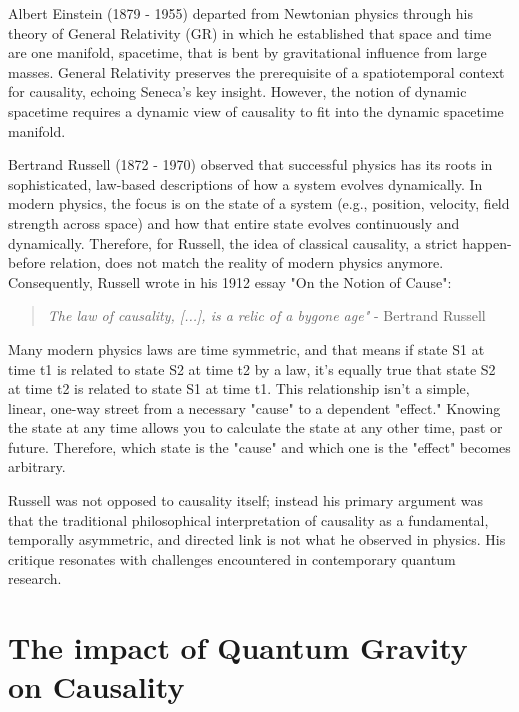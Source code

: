 \documentclass{article}
\begin{document}
Albert Einstein (1879 - 1955) departed from Newtonian physics through his theory of General Relativity\cite{EinsteinPapers1915}  (GR) in which he established that space and time are one manifold, spacetime, that is bent by gravitational influence from large masses. General Relativity preserves the prerequisite of a spatiotemporal context for causality, echoing Seneca's key insight. However, the notion of dynamic spacetime requires a dynamic view of causality to fit into the dynamic spacetime manifold.

Bertrand Russell (1872 - 1970) observed that successful physics has its roots in sophisticated, law-based descriptions of how a system evolves dynamically. In modern physics, the focus is on the state of a system (e.g., position, velocity, field strength across space) and how that entire state evolves continuously and dynamically. Therefore, for Russell, the idea of classical  causality, a strict happen-before relation, does not match the reality of modern physics anymore. Consequently, Russell wrote in his 1912 essay "On the Notion of Cause"\cite{RussellOnCause}:


\begin{quote}
    \begin{center}
            \textit{The law of causality, [...], is a relic of a bygone age"} - Bertrand Russell
    \end{center}
\end{quote}


Many modern physics laws are time symmetric, and that means if state S1 at time t1 is related to state S2 at time t2 by a law, it's equally true that state S2 at time t2 is related to state S1 at time t1. This relationship isn't a simple, linear, one-way street from a necessary "cause" to a dependent "effect." Knowing the state at any time allows you to calculate the state at any other time, past or future. Therefore, which state is the "cause" and which one is the "effect" becomes arbitrary.

Russell was not opposed to causality itself; instead his primary argument was that the traditional philosophical interpretation of causality as a fundamental, temporally asymmetric, and directed link is not what he observed in physics. His critique resonates with challenges encountered in contemporary quantum research.

\newpage

\section{The impact of Quantum Gravity on Causality}
\label{sec:impact_quant_grav}
\end{document}
